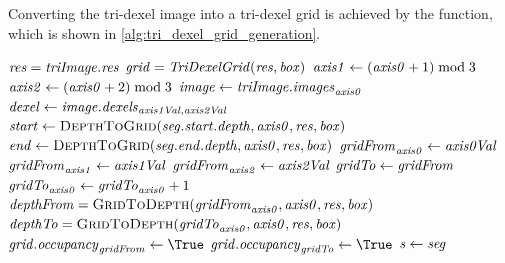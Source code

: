 Converting the tri-dexel image into a tri-dexel grid is achieved by the  function, which is shown in \cref{alg:tri_dexel_grid_generation}.
%
\begin{algorithm}
	\centering
	\begin{algorithmic}[1]
			\State $\mathit{res} = \mathit{triImage}.\mathit{res}$
			\State $\mathit{grid} = \mathit{TriDexelGrid}(\mathit{res}, \mathit{box})$ 
				\State $\mathit{axis1} \gets (\mathit{axis0} + 1) \bmod 3$
				\State $\mathit{axis2} \gets (\mathit{axis0} + 2) \bmod 3$
				\State $\mathit{image} \gets \mathit{triImage}.\mathit{images}_{\mathit{axis0}}$
						\State $\mathit{dexel} \gets \mathit{image}.\mathit{dexels}_{\mathit{axis1Val}, \mathit{axis2Val}}$
							\State $\var{start} \gets \Call{DepthToGrid}{\var{seg}.\var{start}.\var{depth}, \var{axis0}, \var{res}, \var{box}}$
							\State $\var{end} \gets \Call{DepthToGrid}{\var{seg}.\var{end}.\var{depth}, \var{axis0}, \var{res}, \var{box}}$
								\State $\mathit{gridFrom}_{\mathit{axis0}} \gets \mathit{axis0Val}$
								\State $\mathit{gridFrom}_{\mathit{axis1}} \gets \mathit{axis1Val}$
								\State $\mathit{gridFrom}_{\mathit{axis2}} \gets \mathit{axis2Val}$
								\State $\mathit{gridTo} \gets \mathit{gridFrom}$
								\State $\mathit{gridTo}_{\mathit{axis0}} \gets \mathit{gridTo}_{\mathit{axis0}} + 1$
								\State $\var{depthFrom} = \Call{GridToDepth}{\var{gridFrom}_{\var{axis0}}, \var{axis0}, \var{res}, \var{box}}$
								\State $\var{depthTo}   = \Call{GridToDepth}{\var{gridTo}_{\var{axis0}}, \var{axis0}, \var{res}, \var{box}}$
									\State $\var{grid}.\var{occupancy}_{\var{gridFrom}} \gets \True$
								\EndIf
									\State $\var{grid}.\var{occupancy}_{\var{gridTo}} \gets \True$
								\EndIf
								\State $\mathit{s} \gets \mathit{seg}$

\end{algorithmic}
\end{algorithm}
